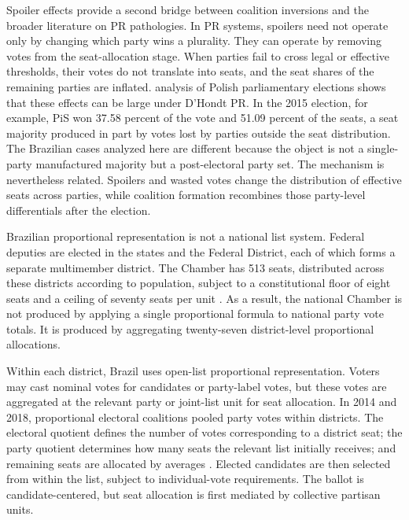 \documentclass[11pt]{article}
\begin{document}
Spoiler effects provide a second bridge between coalition inversions and the broader literature on PR pathologies. In PR systems, spoilers need not operate only by changing which party wins a plurality. They can operate by removing votes from the seat-allocation stage. When parties fail to cross legal or effective thresholds, their votes do not translate into seats, and the seat shares of the remaining parties are inflated. \textcite{kaminski18_spoil_effec_propor_repres_system} analysis of Polish parliamentary elections shows that these effects can be large under D'Hondt PR. In the 2015 election, for example, PiS won 37.58 percent of the vote and 51.09 percent of the seats, a seat majority produced in part by votes lost by parties outside the seat distribution. The Brazilian cases analyzed here are different because the object is not a single-party manufactured majority but a post-electoral party set. The mechanism is nevertheless related. Spoilers and wasted votes change the distribution of effective seats across parties, while coalition formation recombines those party-level differentials after the election.



Brazilian proportional representation is not a national list system. Federal
deputies are elected in the states and the Federal District, each of which forms
a separate multimember district. The Chamber has 513 seats, distributed across
these districts according to population, subject to a constitutional floor of eight
seats and a ceiling of seventy seats per unit
\parencite{camaraDeputadosNumeroEstados}. As a result, the national Chamber is
not produced by applying a single proportional formula to national party vote
totals. It is produced by aggregating twenty-seven district-level proportional
allocations.

Within each district, Brazil uses open-list proportional representation. Voters may
cast nominal votes for candidates or party-label votes, but these votes are
aggregated at the relevant party or joint-list unit for seat allocation. In 2014
and 2018, proportional electoral coalitions pooled party votes within districts.
The electoral quotient defines the number of votes corresponding to a district
seat; the party quotient determines how many seats the relevant list initially
receives; and remaining seats are allocated by averages
\parencite{tse2023quocientes}. Elected candidates are then
selected from within the list, subject to individual-vote requirements. The ballot
is candidate-centered, but seat allocation is first mediated by collective partisan
units.
\end{document}
